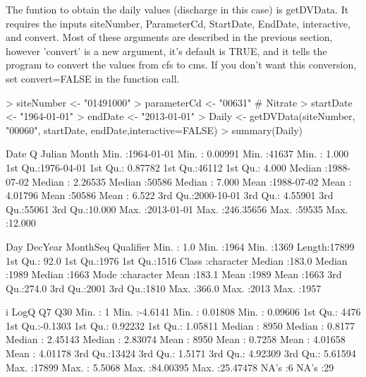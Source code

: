\documentclass[a4paper,11pt]{article}
\begin{document}
The funtion to obtain the daily values (discharge in this case) is getDVData.  It requires the inputs siteNumber, ParameterCd, StartDate, EndDate, interactive, and convert. Most of these arguments are described in the previous section, however 'convert' is a new argument, it's default is TRUE, and it tells the program to convert the values from cfs to cms. If you don't want this conversion, set convert=FALSE in the function call.

\begin{Schunk}
\begin{Sinput}
> siteNumber <- "01491000"
> parameterCd <- "00631"  # Nitrate
> startDate <- "1964-01-01"
> endDate <- "2013-01-01"
> Daily <- getDVData(siteNumber, "00060", startDate, endDate,interactive=FALSE)
> summary(Daily)
\end{Sinput}
\begin{Soutput}
      Date                  Q                 Julian          Month       
 Min.   :1964-01-01   Min.   :  0.00991   Min.   :41637   Min.   : 1.000  
 1st Qu.:1976-04-01   1st Qu.:  0.87782   1st Qu.:46112   1st Qu.: 4.000  
 Median :1988-07-02   Median :  2.26535   Median :50586   Median : 7.000  
 Mean   :1988-07-02   Mean   :  4.01796   Mean   :50586   Mean   : 6.522  
 3rd Qu.:2000-10-01   3rd Qu.:  4.55901   3rd Qu.:55061   3rd Qu.:10.000  
 Max.   :2013-01-01   Max.   :246.35656   Max.   :59535   Max.   :12.000  
                                                                          
      Day           DecYear        MonthSeq     Qualifier        
 Min.   :  1.0   Min.   :1964   Min.   :1369   Length:17899      
 1st Qu.: 92.0   1st Qu.:1976   1st Qu.:1516   Class :character  
 Median :183.0   Median :1989   Median :1663   Mode  :character  
 Mean   :183.1   Mean   :1989   Mean   :1663                     
 3rd Qu.:274.0   3rd Qu.:2001   3rd Qu.:1810                     
 Max.   :366.0   Max.   :2013   Max.   :1957                     
                                                                 
       i              LogQ               Q7                Q30          
 Min.   :    1   Min.   :-4.6141   Min.   : 0.01808   Min.   : 0.09606  
 1st Qu.: 4476   1st Qu.:-0.1303   1st Qu.: 0.92232   1st Qu.: 1.05811  
 Median : 8950   Median : 0.8177   Median : 2.45143   Median : 2.83074  
 Mean   : 8950   Mean   : 0.7258   Mean   : 4.01658   Mean   : 4.01178  
 3rd Qu.:13424   3rd Qu.: 1.5171   3rd Qu.: 4.92309   3rd Qu.: 5.61594  
 Max.   :17899   Max.   : 5.5068   Max.   :84.00395   Max.   :25.47478  
                                   NA's   :6          NA's   :29        
\end{Soutput}
\end{Schunk}
\end{document}
